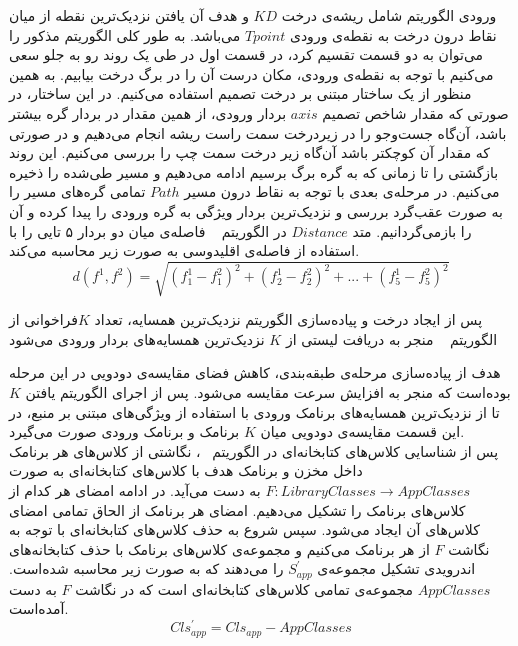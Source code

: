 ورودی الگوریتم شامل ریشه‌ی درخت $KD$ و هدف آن‌ یافتن نزدیک‌ترین نقطه از میان نقاط درون درخت به نقطه‌ی ورودی $Tpoint$ می‌باشد. به طور کلی الگوریتم مذکور را می‌توان به دو قسمت تقسیم کرد، در قسمت اول در طی یک روند رو به جلو سعی می‌کنیم با توجه به نقطه‌ی ورودی، مکان درست آن را در برگ درخت بیابیم. به همین منظور از یک ساختار مبتنی بر درخت تصمیم استفاده می‌کنیم. در این ساختار، در صورتی که  مقدار شاخص تصمیم $axis$ بردار ورودی، از همین مقدار در بردار گره بیشتر باشد، آن‌گاه جست‌و‌جو را در زیر‌درخت سمت راست ریشه انجام می‌دهیم و در صورتی که مقدار آن کوچکتر باشد آن‌گاه زیر درخت سمت چپ را بررسی می‌کنیم. این روند بازگشتی را تا زمانی که به گره برگ برسیم ادامه می‌دهیم و مسیر طی‌شده را ذخیره می‌کنیم. در مرحله‌ی بعدی با توجه به نقاط درون مسیر $Path$ تمامی گره‌های مسیر‌ را به صورت عقب‌گرد بررسی و نزدیک‌ترین بردار ویژگی به گره ورودی را پیدا کرده و آن را بازمی‌گردانیم.
متد $Distance$ در الگوریتم ~ فاصله‌ی میان دو بردار ۵ تایی را با استفاده از فاصله‌ی اقلیدوسی به صورت زیر محاسبه می‌کند.
\begin{equation}
	d(f^1,f^2) = \sqrt{(f^1_{1}-f^2_{1})^2 + (f^1_{2}-f^2_{2})^2  + ... +(f^1_{5}-f^2_{5})^2  }
\end{equation}

پس از ایجاد درخت و پیاده‌سازی الگوریتم نزدیک‌ترین همسایه، تعداد $K $فراخوانی از الگوریتم ~ منجر به دریافت لیستی از $K $ نزدیک‌ترین همسایه‌های بردار ورودی می‌شود

هدف از پیاده‌سازی مرحله‌ی  طبقه‌بندی، کاهش فضای مقایسه‌ی دودویی در این مرحله بوده‌است که منجر به افزایش سرعت مقایسه می‌شود. پس از اجرای الگوریتم یافتن $K$ تا از نزدیک‌ترین همسایه‌های برنامک ورودی با استفاده از ویژگی‌های مبتنی بر منبع، در این قسمت مقایسه‌ی دودویی میان $K$ برنامک و برنامک ورودی صورت می‌گیرد.\\ 
پس از شناسایی کلاس‌های کتابخانه‌ای در الگوریتم ~، نگاشتی از کلاس‌های هر برنامک داخل مخزن و برنامک هدف با کلاس‌های کتابخانه‌ای به صورت $F:LibraryClasses\rightarrow AppClasses$ به دست می‌آید. در ادامه امضای هر کدام از کلاس‌های برنامک را تشکیل می‌دهیم. امضای هر برنامک از الحاق تمامی امضای کلاس‌های آن ایجاد می‌شود. سپس شروع به حذف کلاس‌های کتابخانه‌ای با توجه به نگاشت $F$ از هر برنامک می‌کنیم و مجموعه‌ی کلاس‌های برنامک با حذف کتابخانه‌های اندرویدی تشکیل مجموعه‌ی $S^{'}_{app}$ را می‌دهند که به صورت زیر محاسبه شده‌است.  $AppClasses$ مجموعه‌ی تمامی کلاس‌های کتابخانه‌ای است که در نگاشت $F$ به دست آمده‌است.
\begin{equation}
	Cls^{'}_{app} = Cls_{app} - AppClasses
\end{equation}




